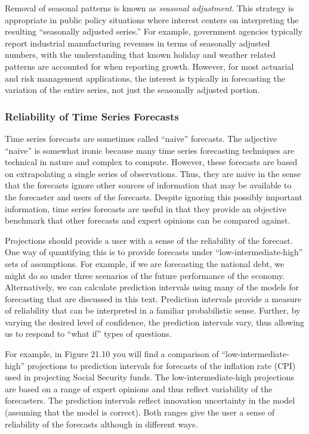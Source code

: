 Removal of seasonal patterns is known as \emph{seasonal adjustment}.
This strategy is appropriate in public policy situations where
interest centers on interpreting the resulting ``seasonally adjusted
series.'' For example, government agencies typically report
industrial manufacturing revenues in terms of seasonally adjusted
numbers, with the understanding that known holiday and weather
related patterns are accounted for when reporting growth. However,
for most actuarial and risk management applications, the interest is
typically in forecasting the variation of the entire series, not
just the seasonally adjusted portion.

\subsubsection*{Reliability of Time Series Forecasts}

Time series forecasts are sometimes called ``naive'' forecasts. The
adjective ``naive'' is somewhat ironic because many time series
forecasting techniques are technical in nature and complex to
compute. However, these forecasts are based on extrapolating a
single series of observations. Thus, they are naive in the sense
that the forecasts ignore other sources of information that may be
available to the forecaster and users of the forecasts. Despite
ignoring this possibly important information, time series forecasts
are useful in that they provide an objective benchmark that other
forecasts and expert opinions can be compared against.


Projections should provide a user with a sense of the reliability of
the forecast. One way of quantifying this is to provide forecasts
under ``low-intermediate-high'' sets of assumptions. For example, if
we are forecasting the national debt, we might do so under three
scenarios of the future performance of the economy. Alternatively,
we can calculate prediction intervals using many of the models for
forecasting that are discussed in this text. Prediction intervals
provide a measure of reliability that can be interpreted in a
familiar probabilistic sense. Further, by varying the desired level
of confidence, the prediction intervals vary, thus allowing us to
respond to ``what if'' types of questions.

For example, in Figure 21.10 you will find a comparison of
``low-intermediate-high'' projections to prediction intervals for
forecasts of the inflation rate (CPI) used in projecting Social
Security funds. The low-intermediate-high projections are based on a
range of expert opinions and thus reflect variability of the
forecasters. The prediction intervals reflect innovation uncertainty
in the model (assuming that the model is correct). Both ranges give
the user a sense of reliability of the forecasts although in
different ways.

